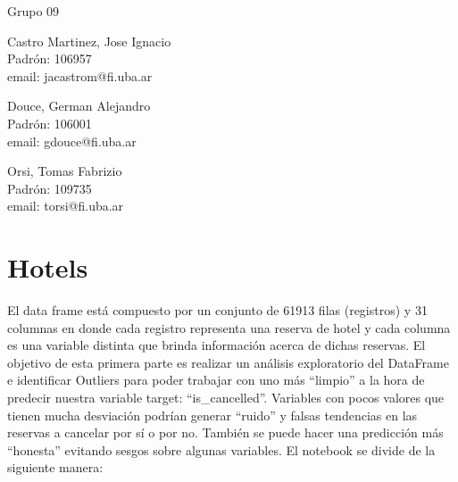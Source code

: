 \documentclass{article}
\begin{document}
\begin{titlepage}
  \vspace{0.4cm}
  \begin{center}
    {\Large{Grupo 09}}\\
    \vspace{0.6cm}
    {\begin{minipage}[t]{.32\textwidth}
        \begin{center}
	Castro  Martinez, Jose Ignacio\\
          {\small{Padrón: 106957}}\\
          {\small{email: jacastrom@fi.uba.ar}}
        \end{center}
	\end{minipage}
	\begin{minipage}[t]{.32\textwidth}
        \begin{center}
	Douce, German Alejandro\\
          {\small{Padrón: 106001}}\\
          {\small{email: gdouce@fi.uba.ar}}\\
        \end{center}
      \end{minipage}
      \begin{minipage}[t]{.32\textwidth}
        \begin{center}
          Orsi, Tomas Fabrizio\\
          {\small{Padrón: 109735}}\\
          {\small{email: torsi@fi.uba.ar}}
        \end{center}
      \end{minipage}}
  \end{center}
\end{titlepage}

\section*{Hotels}
El data frame está compuesto por un conjunto de 61913 filas (registros) y 31 columnas en donde cada registro representa una reserva de hotel y cada columna es una variable distinta que brinda información acerca de dichas reservas. El objetivo de esta primera parte es realizar un análisis exploratorio del DataFrame e identificar Outliers para poder trabajar con uno más “limpio” a la hora de predecir nuestra variable target: “is\_cancelled”. Variables con pocos valores que tienen mucha desviación podrían generar “ruido” y falsas tendencias en las reservas a cancelar por sí o por no. También se puede hacer una predicción más “honesta” evitando sesgos sobre algunas variables.
El notebook se divide de la siguiente manera:
\end{document}
